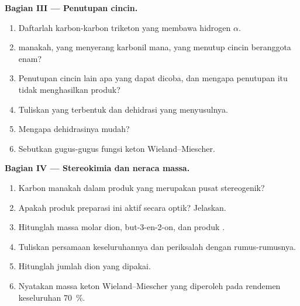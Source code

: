 \begin{problem}
\medskip
\noindent\textbf{Bagian III --- Penutupan cincin.}
\begin{enumerate}[resume]
  \item Daftarlah karbon-karbon triketon yang membawa hidrogen $\alpha$.
  \item {} manakah, yang menyerang karbonil mana, yang menutup cincin beranggota enam?
  \item Penutupan cincin lain apa yang dapat dicoba, dan mengapa penutupan
        itu tidak menghasilkan produk?
  \item Tuliskan  yang terbentuk dan dehidrasi yang menyusulnya.
  \item Mengapa dehidrasinya mudah?
  \item Sebutkan gugus-gugus fungsi keton Wieland--Miescher.
\end{enumerate}

\medskip
\noindent\textbf{Bagian IV --- Stereokimia dan neraca massa.}
\begin{enumerate}[resume]
  \item Karbon manakah dalam produk yang merupakan pusat stereogenik?
  \item Apakah produk preparasi ini aktif secara optik? Jelaskan.
  \item Hitunglah massa molar dion, but-3-en-2-on, dan produk
        .
  \item Tuliskan persamaan keseluruhannya dan periksalah dengan rumus-rumusnya.
  \item Hitunglah jumlah dion yang dipakai.
  \item Nyatakan massa keton Wieland--Miescher yang diperoleh pada rendemen
        keseluruhan 70~\%.
\end{enumerate}
\end{problem}
